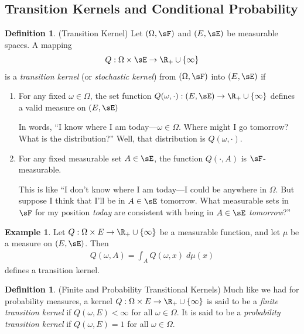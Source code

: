 \documentclass[12pt]{article}
\theoremstyle{plain}
\theoremstyle{definition}
\newtheorem{defn}[thm]{Definition}
\newtheorem{ex}[thm]{Example}
\theoremstyle{remark}
\newcommand{\ra}{\rightarrow}
\begin{document}
\subsection{Transition Kernels and Conditional Probability}

\begin{defn}(Transition Kernel)
Let $(\Omega,\sF)$ and $(E,\sE)$ be measurable spaces. A mapping
\begin{align*}
  Q:\Omega\times \sE \ra \R_+ \cup\{\infty\}
\end{align*}
is a \emph{transition kernel} (or \emph{stochastic kernel}) from
$(\Omega,\sF)$ into $(E,\sE)$ if
\begin{enumerate}
  \item For any fixed $\omega \in \Omega$, the set function
    $Q(\omega, \cdot):(E,\sE)\ra\R_+\cup\{\infty\}$ defines a valid
    measure on $(E,\sE)$

    In words, ``I know where I am today---$\omega\in\Omega$. Where might
    I go tomorrow? What is the distribution?'' Well, that distribution
    is $Q(\omega,\cdot)$.

  \item For any fixed measurable set $A\in\sE$, the function
    $Q(\cdot,A)$ is $\sF$-measurable.

    This is like ``I don't know where I am today---I could be anywhere
    in $\Omega$. But suppose I think that I'll be in $A\in\sE$ tomorrow.
    What measurable sets in $\sF$ for my position \emph{today} are
    consistent with being in $A\in\sE$ \emph{tomorrow}?''
\end{enumerate}
\end{defn}

\begin{ex}
Let $Q:\Omega\times E\ra\R_+\cup\{\infty\}$ be a measurable function,
and let $\mu$ be a measure on $(E,\sE)$. Then
\begin{align*}
  Q(\omega,A) = \int_A Q(\omega,x) \; d\mu(x)
\end{align*}
defines a transition kernel.
\end{ex}

\begin{defn}(Finite and Probability Transitional Kernels)
Much like we had for probability measures, a kernel
$Q:\Omega\times E\ra\R_+\cup\{\infty\}$ is said to be a
\emph{finite transition kernel} if $Q(\omega,E)<\infty$ for all
$\omega\in\Omega$. It is said to be a
\emph{probability transition kernel} if  $Q(\omega,E)=1$ for all
$\omega\in\Omega$.
\end{defn}
\end{document}
